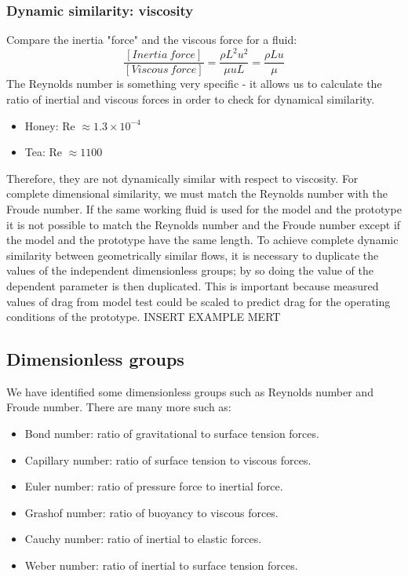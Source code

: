 \documentclass[class=report, crop=false, 12pt,a4paper]{standalone}
\begin{document}
\subsubsection{Dynamic similarity: viscosity}
Compare the inertia "force" and the viscous force for a fluid:
\begin{equation} 
  \frac{[Inertia \ force]}{[Viscous \ force]} = \frac{\rho L^2 u^2}{\mu u L} = \frac{\rho L u }{\mu} 
\end{equation}
The Reynolds number is something very specific - it allows us to calculate the ratio of inertial and viscous forces in order to check for dynamical similarity.
\begin{itemize}[noitemsep]
  \item Honey: Re \(\approx 1.3 \times 10^{-4}\)
  \item Tea: Re \(\approx 1100 \)
\end{itemize}
Therefore, they are not dynamically similar with respect to viscosity. 
For complete dimensional similarity, we must match the Reynolds number with the Froude number. If the same working fluid is used for the model and the prototype it is not possible to match the Reynolds number and the Froude number except if the model and the prototype have the same length. To achieve complete dynamic similarity between geometrically similar flows, it is necessary to duplicate the values of the independent dimensionless groups; by so doing the value of the dependent parameter is then duplicated. This is important because measured values of drag from model test could be scaled to predict drag for the operating conditions of the prototype. INSERT EXAMPLE MERT
\subsection{Dimensionless groups}
We have identified some dimensionless groups such as Reynolds number and Froude number. There are many more such as:
\begin{itemize}[noitemsep]
  \item Bond number: ratio of gravitational to surface tension forces.
  \item Capillary number: ratio of surface tension to viscous forces.
  \item Euler number: ratio of pressure force to inertial force.
  \item Grashof number: ratio of buoyancy to viscous forces.
  \item Cauchy number: ratio of inertial to elastic forces.
  \item Weber number: ratio of inertial to surface tension forces.
\end{itemize}
\end{document}
